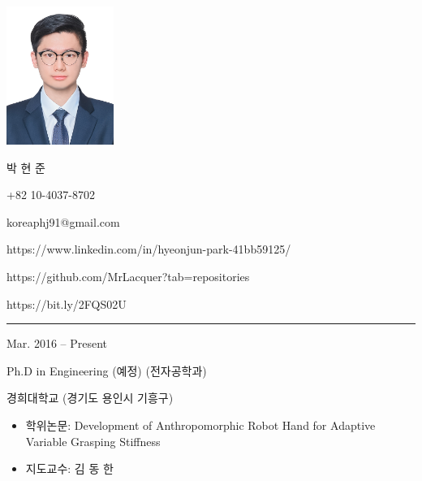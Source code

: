 \documentclass[a4paper,10pt]{article}
\newlength{\cvcolumngapwidth}
\newlength{\cvleftcolumnwidth}
\newlength{\cvrightcolumnwidth}
\newcommand{\cvnamestyle}[1]{{\Large\cvnamefont\textcolor{cvnamecolor}{#1}}}
\newcommand{\cvsectionstyle}[1]{{\normalsize\cvsectionfont\textcolor{cvsectioncolor}{#1}}}
\newcommand{\cvtitlestyle}[1]{{\large\cvtitlefont\textcolor{cvtitlecolor}{#1}}}
\newcommand{\cvdurationstyle}[1]{{\small\cvdurationfont\textcolor{cvdurationcolor}{#1}}}
\newlength{\cvafteritemskipamount}
\newlength{\cvaftersectionskipamount}
\newlength{\cvafternameskipamount}
\newlength{\cvafterpersonalinfolineskipamount}
\newlength{\cvaftertitleskipamount}
\newlength{\cvparskip}
\newcommand{\cvpersonalinfo}[2]{
    \begin{minipage}[t]{\cvleftcolumnwidth}
        \vspace{0mm} %
        \raggedleft #1
    \end{minipage}%
    \hspace{\cvcolumngapwidth}%
    \begin{minipage}[t]{\cvrightcolumnwidth}
        \vspace{0mm} %
        #2
    \end{minipage}

    \vspace{\cvafteritemskipamount}
}
\newcommand{\cvname}[1]{
    \cvnamestyle{#1}

    \vspace{\cvafternameskipamount}
}
\newcommand{\cvpersonalinfolinewithicon}[3]{
    \raisebox{.5\fontcharht\font`E-.5\height}{\texttt{[image: \#2]}}
    #3

    \vspace{\cvafterpersonalinfolineskipamount}
}
\newcommand{\cvsection}[1]{
    \begin{minipage}[t]{\cvleftcolumnwidth}
        \raggedleft\cvsectionstyle{#1}
    \end{minipage}%
    \hspace{\cvcolumngapwidth}%
    \begin{minipage}[t]{\cvrightcolumnwidth}
        \textcolor{cvrulecolor}{\rule{\cvrightcolumnwidth}{0.3mm}}
    \end{minipage}

    \vspace{\cvaftersectionskipamount}
}
\newcommand{\cvitem}[2]{
    \begin{minipage}[t]{\cvleftcolumnwidth}
        \raggedleft #1
    \end{minipage}%
    \hspace{\cvcolumngapwidth}%
    \begin{minipage}[t]{\cvrightcolumnwidth}
        \setlength{\parskip}{\cvparskip} #2
    \end{minipage}

    \vspace{\cvafteritemskipamount}
}
\newcommand{\cvtitle}[1]{
    \cvtitlestyle{#1}

    \vspace{\cvaftertitleskipamount}
    \vspace{-\cvparskip}
}
\begin{document}

\cvpersonalinfo{
    \includegraphics[height=45mm]{Hyeonjun02.jpg}
}{
    \cvname{\Huge 박  현  준}


    \cvpersonalinfolinewithicon{height=5mm}{067-phone.pdf}{
        +82 10-4037-8702
    }

    \cvpersonalinfolinewithicon{height=5mm}{070-envelop.pdf}{
        koreaphj91@gmail.com
    }

    \cvpersonalinfolinewithicon{height=5mm}{458-linkedin.pdf}{
        https://www.linkedin.com/in/hyeonjun-park-41bb59125/
    }
    
    \cvpersonalinfolinewithicon{height=5mm}{github.png}{
        https://github.com/MrLacquer?tab=repositories
    }
    
    \cvpersonalinfolinewithicon{height=5mm}{google_scholar.png}{
        https://bit.ly/2FQS02U
    }
}



%
%


\vspace*{1cm}

\cvsection{EDUCATION}

\cvitem{
    \cvdurationstyle{Mar. 2016 -- Present}
}{
    \cvtitle{Ph.D in Engineering (예정) (전자공학과)}
    경희대학교 (경기도 용인시 기흥구)
    \begin{itemize}[leftmargin=*]
        \item 학위논문: Development of Anthropomorphic Robot Hand for Adaptive Variable Grasping Stiffness
        \item 지도교수: 김 동 한
    \end{itemize}
}
\end{document}
